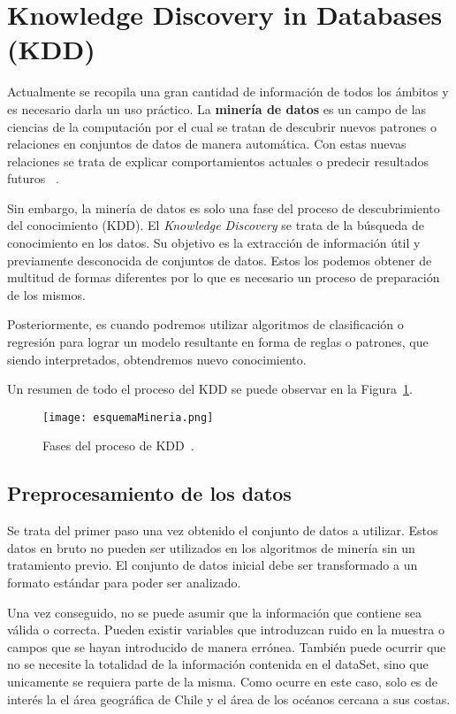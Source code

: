 \section{Knowledge Discovery in Databases (KDD)}

Actualmente se recopila una gran cantidad de información de todos los ámbitos y es necesario darla un uso práctico. La \textbf{minería de datos} es un campo de las ciencias de la computación por el cual se tratan de descubrir nuevos patrones o relaciones en conjuntos de datos de manera automática. Con estas nuevas relaciones se trata de explicar comportamientos actuales o predecir resultados futuros~ \cite{mineria_tecnicas_herramientas}. 

Sin embargo, la minería de datos es solo una fase del proceso de descubrimiento del conocimiento (KDD). El \emph{Knowledge Discovery} se trata de la búsqueda de conocimiento en los datos. Su objetivo es la extracción de información útil y previamente desconocida de conjuntos de datos. Estos los podemos obtener de multitud de formas diferentes por lo que es necesario un proceso de preparación de los mismos.

Posteriormente, es cuando podremos utilizar algoritmos de clasificación o regresión para lograr un modelo resultante en forma de reglas o patrones, que siendo interpretados, obtendremos nuevo conocimiento.

Un resumen de todo el proceso del KDD se puede observar en la Figura~\ref{fasesKDD}.

\begin{figure}%
	\centering
	\texttt{[image: esquemaMineria.png]}
	\caption[Fases del proceso de KDD]{Fases del proceso de KDD~\cite{mineria_tecnicas_herramientas}.}
	\label{fasesKDD}
\end{figure}


\subsection{Preprocesamiento de los datos}
Se trata del primer paso una vez obtenido el conjunto de datos a utilizar. Estos datos en bruto no pueden ser utilizados en los algoritmos de minería sin un tratamiento previo. El conjunto de datos inicial debe ser transformado a un formato estándar para poder ser analizado.

Una vez conseguido, no se puede asumir que la información que contiene sea válida o correcta. Pueden existir variables que introduzcan ruido en la muestra o campos que se hayan introducido de manera errónea. También puede ocurrir que no se necesite la totalidad de la información contenida en el dataSet, sino que unicamente se requiera parte de la misma. Como ocurre en este caso, solo es de interés la el área geográfica de Chile y el área de los océanos cercana a sus costas.

